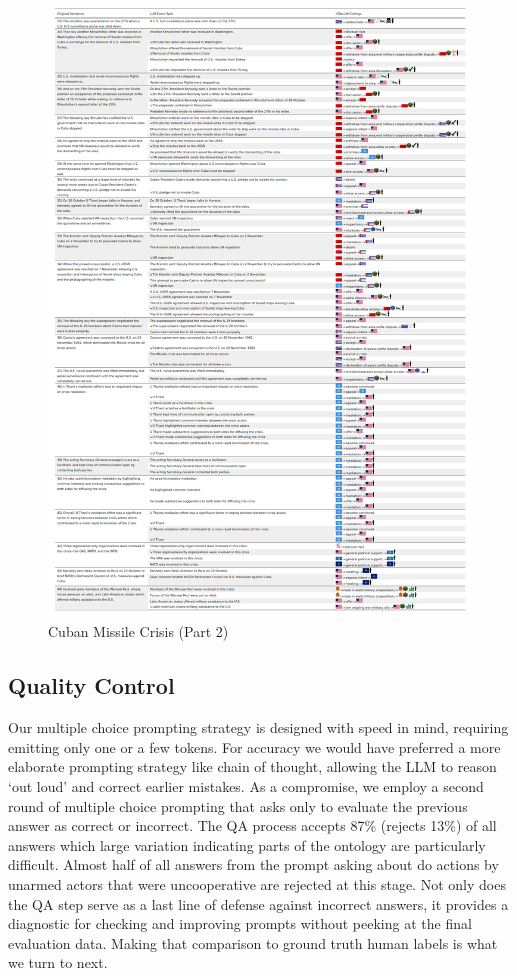 \documentclass[
]{article}
\begin{document}
\begin{figure}[H]

{\centering \includegraphics{Figure1_Cuban_Missile_Crisis3b.png}

}

\caption{Cuban Missile Crisis (Part 2)}

\end{figure}%

\subsection{Quality Control}\label{quality-control}

Our multiple choice prompting strategy is designed with speed in mind,
requiring emitting only one or a few tokens. For accuracy we would have
preferred a more elaborate prompting strategy like chain of thought,
allowing the LLM to reason `out loud' and correct earlier mistakes. As a
compromise, we employ a second round of multiple choice prompting that
asks only to evaluate the previous answer as correct or incorrect. The
QA process accepts 87\% (rejects 13\%) of all answers which large
variation indicating parts of the ontology are particularly difficult.
Almost half of all answers from the prompt asking about do actions by
unarmed actors that were uncooperative are rejected at this stage. Not
only does the QA step serve as a last line of defense against incorrect
answers, it provides a diagnostic for checking and improving prompts
without peeking at the final evaluation data. Making that comparison to
ground truth human labels is what we turn to next.
\end{document}
